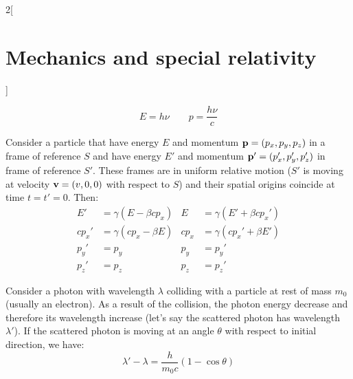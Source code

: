\documentclass[../../../main.tex]{subfiles}
\begin{document}
\begin{multicols}{2}[\section{Mechanics and special relativity}]
\begin{prop}
        $$E=h\nu\qquad p=\frac{h\nu}{c}$$
    \end{prop}
    \begin{prop}
        Consider a particle that have energy $E$ and momentum $\boldsymbol{\mathrm{p}}=(p_x,p_y,p_z)$ in a frame of reference $S$ and have energy $E'$ and momentum $\boldsymbol{\mathrm{p}}'=(p_x',p_y',p_z')$ in frame of reference $S'$. These frames are in uniform relative motion ($S'$ is moving at velocity $\boldsymbol{\mathrm{v}}=(v,0,0)$ with respect to $S$) and their spatial origins coincide at time $t=t'=0$. Then:
        \begin{align*}
            E'    & =\gamma(E-\beta cp_x) & E    & =\gamma(E'+\beta cp_x') \\
            cp_x' & =\gamma(cp_x-\beta E) & cp_x & =\gamma(cp_x'+\beta E') \\
            p_y'  & =p_y                  & p_y  & =p_y'                   \\
            p_z'  & =p_z                  & p_z  & =p_z'
        \end{align*}
    \end{prop}
    \begin{prop}
        Consider a photon with wavelength $\lambda$ colliding with a particle at rest of mass $m_0$ (usually an electron). As a result of the collision, the photon energy decrease and therefore its wavelength increase (let's say the scattered photon has wavelength $\lambda'$). If the scattered photon is moving at an angle $\theta$ with respect to initial direction, we have:
        $$\lambda'-\lambda=\frac{h}{m_0c}(1-\cos\theta)$$
        \begin{center}
            \begin{minipage}{\linewidth}
                \centering
                
            \end{minipage}
        \end{center}
    \end{prop}

\end{multicols}
\end{document}
